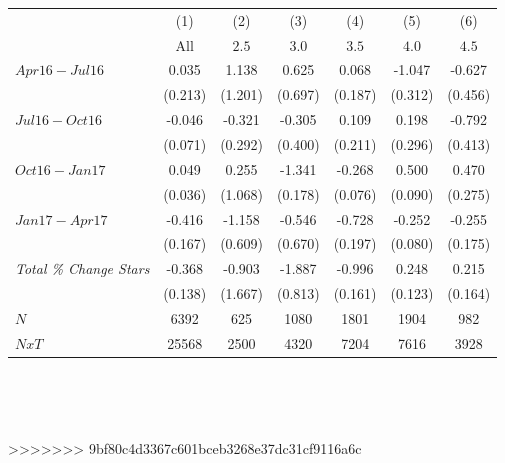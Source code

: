 \begin{center}
\begin{tabular}{lcccccc}
\hline  & (1) & (2) & (3) & (4) & (5) & (6)\\
 & All &  $ 2.5 $  &  $ 3.0 $  &  $ 3.5 $  &  $ 4.0 $  &  $ 4.5$ \\
\hline  $ Apr16-Jul16 $  & 0.035 & 1.138 & 0.625 & 0.068 & -1.047 & -0.627\\
 & (0.213) & (1.201) & (0.697) & (0.187) & (0.312) & (0.456)\\
 $ Jul16-Oct16 $  & -0.046 & -0.321 & -0.305 & 0.109 & 0.198 & -0.792\\
 & (0.071) & (0.292) & (0.400) & (0.211) & (0.296) & (0.413)\\
 $ Oct16-Jan17 $  & 0.049 & 0.255 & -1.341 & -0.268 & 0.500 & 0.470\\
 & (0.036) & (1.068) & (0.178) & (0.076) & (0.090) & (0.275)\\
 $ Jan17-Apr17 $  & -0.416 & -1.158 & -0.546 & -0.728 & -0.252 & -0.255\\
 & (0.167) & (0.609) & (0.670) & (0.197) & (0.080) & (0.175)\\
\hline \textit{Total \% Change Stars} & -0.368 & -0.903 & -1.887 & -0.996 & 0.248 & 0.215\\
  & (0.138) & (1.667) & (0.813) & (0.161) & (0.123) & (0.164)\\
\hline  $ N $  & 6392 & 625 & 1080 & 1801 & 1904 & 982\\
 $ NxT $  & 25568 & 2500 & 4320 & 7204 & 7616 & 3928\\
\hline\end{tabular}\\
\begin{tiny} \hfil\end{tiny}\\
\end{center}
>>>>>>> 9bf80c4d3367c601bceb3268e37dc31cf9116a6c
